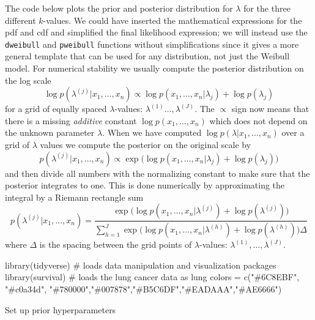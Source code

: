 \documentclass[
  letterpaper,
  DIV=11,
  numbers=noendperiod]{scrartcl}
\newenvironment{Shaded}{\begin{snugshade}}{\end{snugshade}}
\newcommand{\CommentTok}[1]{\textcolor[rgb]{0.37,0.37,0.37}{#1}}
\newcommand{\FunctionTok}[1]{\textcolor[rgb]{0.28,0.35,0.67}{#1}}
\newcommand{\NormalTok}[1]{\textcolor[rgb]{0.00,0.23,0.31}{#1}}
\newcommand{\OtherTok}[1]{\textcolor[rgb]{0.00,0.23,0.31}{#1}}
\newcommand{\StringTok}[1]{\textcolor[rgb]{0.13,0.47,0.30}{#1}}
\begin{document}
\begin{tcolorbox}
The code below plots the prior and posterior distribution for
\(\lambda\) for the three different \(k\)-values. We could have inserted
the mathematical expressions for the pdf and cdf and simplified the
final likelihood expression; we will instead use the \texttt{dweibull}
and \texttt{pweibull} functions without simplifications since it gives a
more general template that can be used for any distribution, not just
the Weibull model. For numerical stability we usually compute the
posterior distribution on the log scale \[
\log p(\lambda^{(j)} \vert x_1,\ldots,x_n) \propto \log p(x_1,\ldots,x_n \vert \lambda_j) + \log p(\lambda_j)
\] for a grid of equally spaced \(\lambda\)-values:
\(\lambda^{(1)}\ldots,\lambda^{(J)}\). The \(\propto\) sign now means
that there is a missing \emph{additive} constant
\(\log p(x_1,\ldots,x_n)\) which does not depend on the unknown
parameter \(\lambda\). When we have computed
\(\log p(\lambda \vert x_1,\ldots,x_n)\) over a grid of \(\lambda\)
values we compute the posterior on the original scale by \[
p(\lambda^{(j)} \vert x_1,\ldots,x_n) \propto \exp\Big( \log p(x_1,\ldots,x_n \vert \lambda_j) + \log p(\lambda_j) \Big)
\] and then divide all numbers with the normalizing constant to make
sure that the posterior integrates to one. This is done numerically by
approximating the integral by a Riemann rectangle sum \[
p(\lambda^{(j)} \vert x_1,\ldots,x_n) = 
\frac{\exp\Big( \log p(x_1,\ldots,x_n \vert \lambda^{(j)}) + \log p(\lambda^{(j)}) \Big)}
{\sum_{h=1}^J \exp\Big( \log p(x_1,\ldots,x_n \vert \lambda^{(h)}) + \log p(\lambda^{(h)}) \Big) \Delta}
\] where \(\Delta\) is the spacing between the grid points of
\(\lambda\)-values: \(\lambda^{(1)}, \ldots, \lambda^{(J)}\).

\begin{Shaded}
\begin{Highlighting}[]
\FunctionTok{library}\NormalTok{(tidyverse) }\CommentTok{\# loads data manipulation and visualization packages}
\FunctionTok{library}\NormalTok{(survival) }\CommentTok{\# loads the lung cancer data as \textasciigrave{}lung\textasciigrave{}}
\NormalTok{colors }\OtherTok{=} \FunctionTok{c}\NormalTok{(}\StringTok{"\#6C8EBF"}\NormalTok{, }\StringTok{"\#c0a34d"}\NormalTok{, }\StringTok{"\#780000"}\NormalTok{,}\StringTok{"\#007878"}\NormalTok{,}\StringTok{"\#B5C6DF"}\NormalTok{,}\StringTok{"\#EADAAA"}\NormalTok{,}\StringTok{"\#AE6666"}\NormalTok{)}
\end{Highlighting}
\end{Shaded}

Set up prior hyperparameters


\end{tcolorbox}
\end{document}
